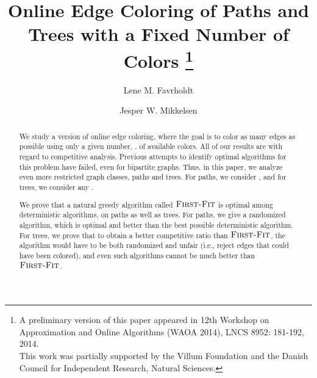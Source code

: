 \documentclass[smallextended]{svjour3}
\newcommand{\FF}{\ensuremath{\operatorname{\textsc{First-Fit}}}\xspace}
\begin{document}

\title{Online Edge Coloring of Paths and Trees with a Fixed Number of Colors \thanks{
A preliminary version of this paper appeared in 12th Workshop on Approximation and Online Algorithms (WAOA 2014), LNCS 8952: 181-192, 2014. \\This work was partially supported by the Villum Foundation and the Danish Council for Independent Research, Natural Sciences.}
}

\author{Lene M. Favrholdt         \and
        Jesper W. Mikkelsen
}


\maketitle

\begin{abstract}
We study a version of online edge coloring, where the goal is to
 color as many edges as possible using only a given number, , of
 available colors.
All of our results are with regard to competitive analysis.
Previous attempts to identify optimal algorithms for this problem
 have failed, even for bipartite graphs.
Thus, in this paper, we analyze even more restricted graph classes,
 paths and trees.
For paths, we consider , and for trees, we consider any .

We prove that a natural greedy algorithm called \FF is optimal among
 deterministic algorithms, on paths as well as trees.
For paths, we give a randomized algorithm, which is optimal and better
 than the best possible deterministic algorithm.
For trees, we prove that to obtain a better competitive ratio than
 \FF, the algorithm would have to be both randomized and
 unfair (i.e., reject  edges that could have been colored), and even
 such algorithms cannot be much better than \FF.
\end{abstract}
\end{document}
